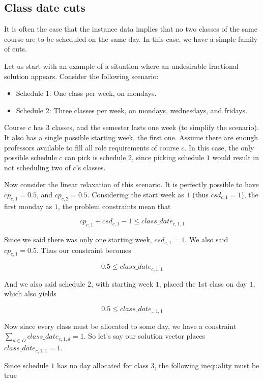 \subsection{Class date cuts}

It is often the case that the instance data implies that no two classes of the same course are to be scheduled on the same day. In this case, we have a simple family of cuts.

Let us start with an example of a situation where an undesirable fractional solution appears. Consider the following scenario:

\begin{itemize}
  \item Schedule 1: One class per week, on mondays.
  \item Schedule 2: Three classes per week, on mondays, wednesdays, and fridays.
\end{itemize}

Course $c$ has 3 classes, and the semester lasts one week (to simplify the scenario). It also has a single possible starting week, the first one. Assume there are enough professors available to fill all role requirements of course $c$. In this case, the only possible schedule $c$ can pick is schedule 2, since picking schedule $1$ would result in not scheduling two of $c$'s classes.

Now consider the linear relaxation of this scenario. It is perfectly possible to have $cp_{c, 1} = 0.5$, and $cp_{c, 2} = 0.5$. Considering the start week as $1$ (thus $csd_{c, 1} = 1$), the first monday as $1$, the problem constraints mean that

$$
cp_{c, 1} + csd_{c, 1} - 1 \le class\_date_{c, 1, 1}
$$

Since we said there was only one starting week, $csd_{c, 1} = 1$. We also said $cp_{c, 1} = 0.5$. Thus our constraint becomes

$$
0.5 \le class\_date_{c, 1, 1}
$$

And we also said schedule $2$, with starting week $1$,  placed the $1$st class on day $1$, which also yields

$$
0.5 \le class\_date_{_c, 1, 1}
$$

Now since every class must be allocated to some day, we have a constraint $\sum_{d \in D} class\_date_{c, 1, d} = 1$. So let's say our solution vector places $class\_date_{c, 1, 1} = 1$.

Since schedule $1$ has no day allocated for class $3$, the following inequality must be true


